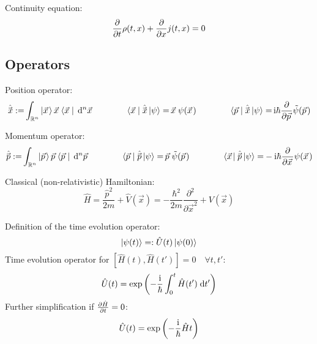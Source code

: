 			\noindent
			Continuity equation:
			\begin{equation}
				\pdv{t}\rho(t,x) + \pdv{x}j(t,x) = 0
			\end{equation}

	\subsection{Operators}
		\noindent
		Position operator:
		\begin{equation}
			\begin{aligned}
				\hat{\vec{x}} :=& \int_{\mathbb{R}^n} \Ket{\vec{x}} \vec{x} \Bra{\vec{x}\,}\;\dd^n\vec{x} &\hsp
				\Bra{\vec{x}\,}\hat{\vec{x}}\Ket{\psi} =& \,\vec{x}\, \psi(\vec{x}) &\hsp
				\Bra{\vec{p}\,}\hat{\vec{x}}\Ket{\psi} =& \,\i\hbar\pdv{\vec{p}}\tilde{\psi}(\vec{p}) \\
			\end{aligned}
		\end{equation}

		\noindent
		Momentum operator:
		\begin{equation}
			\begin{aligned}
				\hat{\vec{p}} :=& \int_{\mathbb{R}^n} \Ket{\vec{p}} \vec{p} \Bra{\vec{p}\,}\;\dd^n\vec{p} &\hsp
				\Bra{\vec{p}\,}\hat{\vec{p}}\Ket{\psi} =& \,\vec{p}\, \tilde{\psi}(\vec{p}) &\hsp
				\Bra{\vec{x}}\hat{\vec{p}}\Ket{\psi} =& -\i\hbar\pdv{\vec{x}} \psi(\vec{x}) \\
			\end{aligned}
		\end{equation}

		\noindent
		Classical (non-relativistic) Hamiltonian:
		\begin{equation}
			\hat{H} = \frac{\hat{p}^2}{2m}+\hat{V}(\vec{x}) = -\frac{\hbar^2}{2m}\frac{\partial^2}{\partial \vec{x}^2} + V(\vec{x})
		\end{equation}

		\noindent
		Definition of the time evolution operator:
		\begin{equation}
			\Ket{\psi(t)} =: \hat{U}(t)\Ket{\psi(0)}
		\end{equation}
		Time evolution operator for $\left[\hat{H}(t),\hat{H}(t')\right] = 0\quad\forall t,t'$:
		\begin{equation}
			\hat{U}(t) = \exp\qty(-\frac{\mathrm{i}}{\hbar}\int_0^t \hat{H}(t')\;\dd t')
		\end{equation}
		Further simplification if $\pdv{\hat{H}}{t}=0$:
		\begin{equation}
			\hat{U}(t) = \exp\qty(-\frac{\mathrm{i}}{\hbar}\hat{H} t)
		\end{equation}

